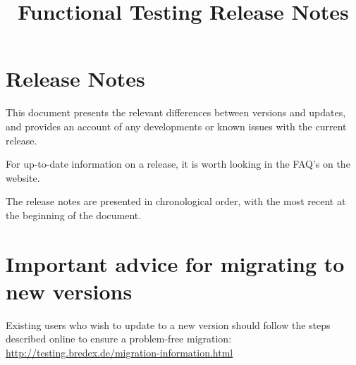 
\title{Functional Testing Release Notes}
\author*{}{}
\maketitle

\setcounter{secnumdepth}{0}

\clearpage
\section{Release Notes}
This document presents the relevant differences between versions and updates, and provides an account of any developments or known issues with the current release. 

For up-to-date information on a release, it is worth looking in the FAQ's on the website. 

The release notes are presented in chronological order, with the most recent at the beginning of the document.  

\section{Important advice for migrating to new  versions}
Existing users who wish to update to a new version should follow the steps described online to ensure a problem-free migration:\\
\url{http://testing.bredex.de/migration-information.html}






